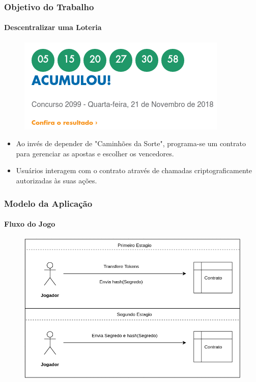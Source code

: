 \documentclass[11pt, red]{beamer}
\begin{document}
\begin{frame}
    \frametitle{Objetivo do Trabalho}
    \framesubtitle{Descentralizar uma Loteria}
    \begin{figure}[htb]
        \begin{center}
            \includegraphics[width=0.5\linewidth]{fig/mega.png}
        \end{center}
    \end{figure}
    \begin{beamerboxesrounded}[lower=fundocinza,shadow=true]{}
            \begin{itemize}
                \item Ao inv\'es de depender de "Caminh\~oes da Sorte", programa-se um contrato para gerenciar as apostas e escolher os vencedores.
                \item Usu\'arios interagem com o contrato atrav\'es de chamadas criptograficamente autorizadas \`as suas a\c{c}\~oes.
            \end{itemize}
    \end{beamerboxesrounded}
\end{frame}

\begin{frame}
    \frametitle{Modelo da Aplica\c{c}\~ao}
    \framesubtitle{Fluxo do Jogo}
    \begin{figure}[htb]\label{ex1}
        \begin{center}
            \includegraphics[width=0.8\linewidth]{fig/flow.png}
        \end{center}
    \end{figure}
\end{frame}
\end{document}
